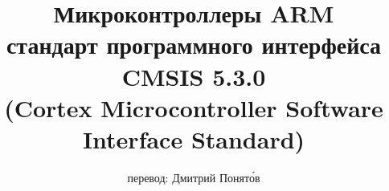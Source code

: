 

\author{{\small перевод:} Дмитрий Понят\'{о}в }
\title{Микроконтроллеры ARM \cm{\rcirc}\\
стандарт программного интерфейса\\
CMSIS 5.3.0\\
{\small(Cortex Microcontroller Software Interface Standard)}
}




\maketitle
\tableofcontents
\secdown







